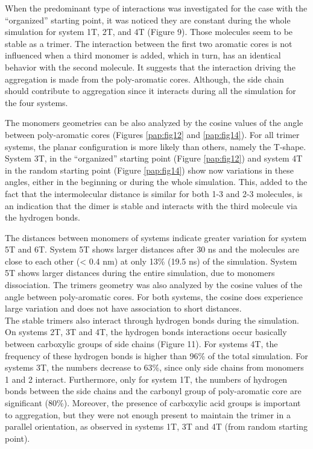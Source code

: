 When the predominant type of interactions was investigated for the case with the ``organized'' starting point, it was noticed they are constant during the whole simulation for system 1T, 2T, and 4T (Figure 9). Those molecules seem to be stable as a trimer. The interaction between the first two aromatic cores is not influenced when a third monomer is added, which in turn, has an identical behavior with the second molecule. It suggests that the interaction driving the aggregation is made from the poly-aromatic cores. Although, the side chain should contribute to aggregation since it interacts during all the simulation for the four systems. 

The monomers geometries can be also analyzed by the cosine values of the angle between poly-aromatic cores (Figures \ref{pap:fig12} and \ref{pap:fig14}). For all trimer systems, the planar configuration is more likely than others, namely the T-shape. System 3T, in the ``organized'' starting point  (Figure \ref{pap:fig12}) and system 4T in the random starting point (Figure \ref{pap:fig14}) show now variations in these angles, either in the beginning or during the whole simulation. This, added to the fact that the intermolecular distance is similar for both 1-3 and 2-3 molecules, is an indication that the dimer is stable and interacts with the third molecule via the hydrogen bonds. 

The distances between monomers of systems indicate greater variation for system 5T and 6T. System 5T shows larger distances after 30 ns and the molecules are close to each other (< 0.4 nm) at only 13\% (19.5 ns) of the simulation. System 5T shows larger distances during the entire simulation, due to monomers dissociation. The trimers geometry was also analyzed by the cosine values of the angle between poly-aromatic cores. For both systems, the cosine does experience large variation and does not have association to short distances.\\ 

The stable trimers also interact through hydrogen bonds during the simulation. On systems 2T, 3T and 4T, the hydrogen bonds interactions occur basically between carboxylic groups of side chains (Figure 11). For systems 4T, the frequency of these hydrogen bonds is higher than 96\% of the total simulation. For systems 3T, the numbers decrease to 63\%, since only side chains from monomers 1 and 2 interact. Furthermore, only for system 1T, the numbers of hydrogen bonds between the side chains and the carbonyl group of poly-aromatic core are significant (80\%). Moreover, the presence of carboxylic acid groups is important to aggregation, but they were not enough present to maintain the trimer in a parallel orientation, as observed in systems 1T, 3T and 4T (from random starting point).

